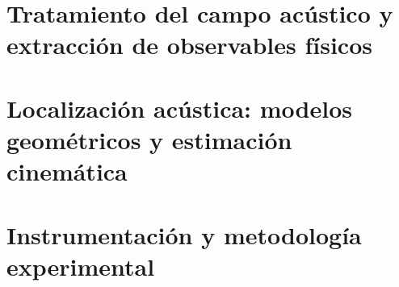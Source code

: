 \documentclass[12pt,letterpaper]{report}
\begin{document}
\hypersetup{pageanchor=false}



\clearpage

\hypersetup{pageanchor=true}

\setcounter{page}{3}

\tableofcontents

\clearpage

\chapter{Tratamiento del campo acústico y extracción de observables físicos}


\clearpage

\chapter{Localización acústica: modelos geométricos y estimación cinemática}


\clearpage

\chapter{Instrumentación y metodología experimental}


\clearpage



\clearpage

\appendix


\clearpage

\nocite{*}

\end{document}
